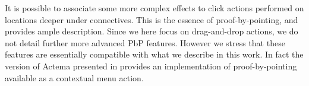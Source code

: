 


It is possible to associate some more complex effects to click actions performed
on locations deeper under connectives. This is the essence of proof-by-pointing,
and~\cite{PbP} provides ample description. Since we here focus on drag-and-drop
actions, we do not detail further more advanced PbP features. However we stress
that these features are essentially compatible with what we describe in this
work. In fact the version of Actema presented in  provides an
implementation of proof-by-pointing available as a contextual menu action.


